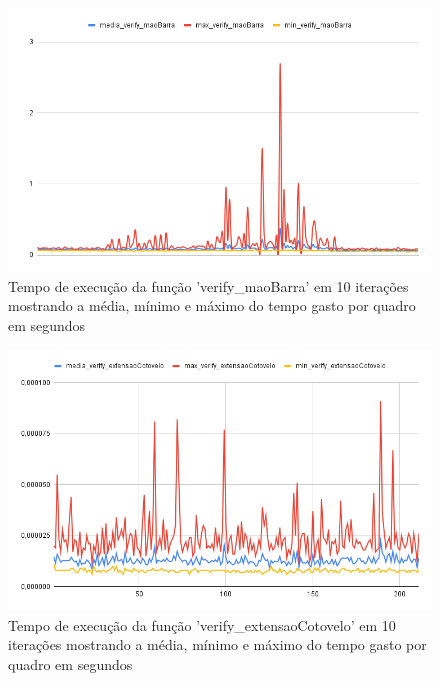 \begin{figure}[!htb]
	\centering
	\includegraphics[scale=0.6]{figuras/grafico/maoBarra.png}
	\caption{Tempo de execução da função 'verify\_maoBarra' em 10 iterações mostrando a média, mínimo e máximo do tempo gasto por quadro em segundos}
\end{figure}

\begin{figure}[!htb]
	\centering
	\includegraphics[scale=0.6]{figuras/grafico/extensaoCotovelo.png}
	\caption{Tempo de execução da função 'verify\_extensaoCotovelo' em 10 iterações mostrando a média, mínimo e máximo do tempo gasto por quadro em segundos}
\end{figure}

